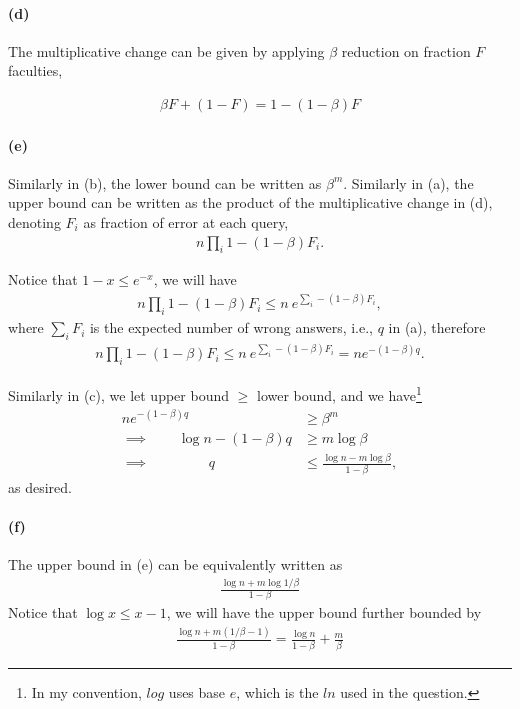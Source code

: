 \documentclass[12pt]{article}
\begin{document}
\paragraph{(d)}
The multiplicative change can be given by applying $\beta$ reduction on fraction $F$ faculties, 

\begin{align*}
\beta F + (1 - F) = 1 - (1 - \beta) F
\end{align*}

\paragraph{(e)} Similarly in (b), the lower bound can be written as $\beta^m$. Similarly in (a), the upper bound can be written as the product of the multiplicative change in (d), denoting $F_i$ as fraction of error at each query, 
\begin{align*}
n\prod_{i}1-(1-\beta)F_i.
\end{align*}

Notice that $1-x \leq e^{-x}$, we will have 
\begin{align*}
n\prod_{i}1-(1-\beta)F_i \leq n\: e^{\sum_i -(1-\beta)F_i},
\end{align*}
where $\sum_i F_i$ is the expected number of wrong answers, i.e., $q$ in (a), therefore 
\begin{align*}
n\prod_{i}1-(1-\beta)F_i \leq n\: e^{\sum_i -(1-\beta)F_i} = ne^{-(1-\beta)q}.
\end{align*}

Similarly in (c), we let upper bound $\geq$ lower bound, and we have\footnote{In my convention, $log$ uses base $e$, which is the $ln$ used in the question.} 
\begin{align*}
ne^{-(1-\beta)q} &\geq \beta^m\\
\implies\:\:\:\:\:\:\:\:\:\log n -(1-\beta)q &\geq m\log\beta\\
\implies\:\:\:\:\:\:\:\:\:\:\:\:\:\:\:\:\:\:\ q &\leq \frac{\log n - m \log\beta}{1-\beta},
\end{align*}
as desired.

\paragraph{(f)}
The upper bound in (e) can be equivalently written as
\begin{align*}
\frac{\log n + m \log{1/\beta}}{1-\beta}
\end{align*}
Notice that $\log  x \leq x - 1$, we will have the upper bound further bounded by 
\begin{align*}
\frac{\log n + m (1/\beta - 1)}{1-\beta} = \frac{\log n}{1-\beta} + \frac{m}{\beta}
\end{align*}
\end{document}
